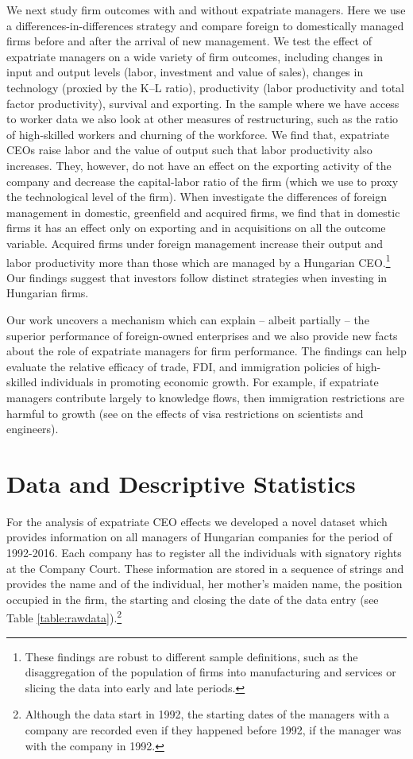 \documentclass[12pt,a4paper]{article}
\begin{document}
We next study firm outcomes with and without expatriate managers. Here we use a differences-in-differences strategy and compare foreign to domestically managed firms before and after the arrival of new management. We test the effect of expatriate managers on a wide variety of firm outcomes, including changes in input and output levels (labor, investment and value of sales), changes in technology (proxied by the K--L ratio), productivity (labor productivity and total factor productivity), survival and exporting.  In the sample where we have access to worker data we also look at other measures of restructuring, such as the ratio of high-skilled workers and churning of the workforce.  We find that, expatriate CEOs raise labor and the value of output such that labor productivity also increases.  They, however, do not have an effect on the exporting activity of the company and decrease the capital-labor ratio of the firm (which we use to proxy the technological level of the firm). When investigate the differences of foreign management in domestic, greenfield and acquired firms, we find that in domestic firms it has an effect only on exporting and in acquisitions on all the outcome variable.  Acquired firms under foreign management increase their output and labor productivity more than those which are managed by a Hungarian CEO.\footnote{These findings are robust to different sample definitions, such as the disaggregation of the population of firms into manufacturing and services or slicing the data into early and late periods.} Our findings suggest that investors follow distinct strategies when investing in Hungarian firms. 

Our work uncovers a mechanism which can explain -- albeit partially -- the superior performance of foreign-owned enterprises and we also provide new facts about the role of expatriate managers for firm performance. The  findings can help evaluate the relative efficacy of trade, FDI, and immigration policies of high-skilled individuals in promoting economic growth. For example, if expatriate managers contribute largely to knowledge flows, then immigration restrictions are harmful to growth (see \cite{Kerr2010-le} on the effects of visa restrictions on scientists and engineers). 

\section{Data and Descriptive Statistics}
For the analysis of expatriate CEO effects we developed a novel dataset which provides information on all managers of Hungarian companies for the period of 1992-2016. Each company has to register all the individuals with signatory rights at the Company Court. These information are stored in a sequence of strings and provides the name and of the individual, her mother's maiden name, the position occupied in the firm, the starting and closing the date of the data entry (see Table \ref{table:rawdata}).\footnote{Although the data start in 1992, the starting dates of the managers with a company are recorded even if they happened before 1992, if the manager was with the company in 1992.}
\end{document}
